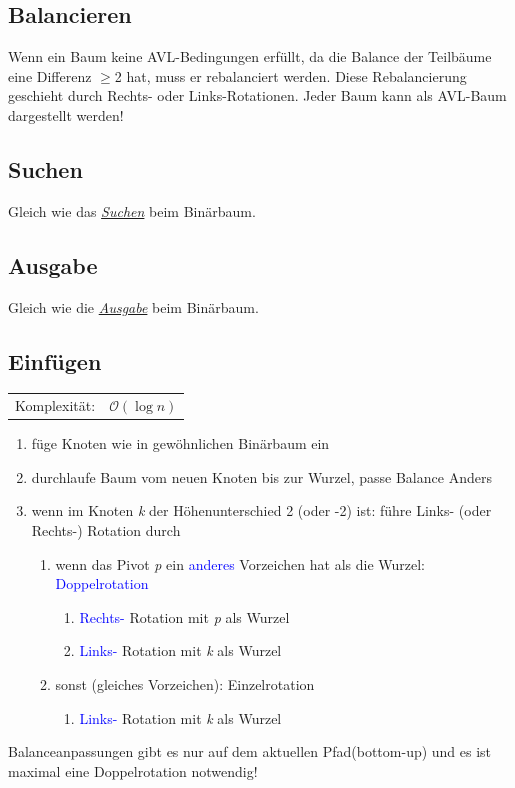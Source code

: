 \documentclass[12pt,a4paper]{article}
\begin{document}
\subsection{Balancieren}
Wenn ein Baum keine AVL-Bedingungen erfüllt, da die Balance der Teilbäume eine Differenz $\geq $2 hat, muss er rebalanciert werden. Diese Rebalancierung geschieht durch Rechts- oder Links-Rotationen. Jeder Baum kann als AVL-Baum dargestellt werden!

\subsection{Suchen}
Gleich wie das \textit{\hyperref[sec:SuchenBinaer]{Suchen}} beim Binärbaum.

\subsection{Ausgabe}
Gleich wie die \textit{\hyperref[sec:AusgabeBinaer]{Ausgabe}} beim Binärbaum.

\subsection{Einfügen}
\begin{tabularx}{\textwidth}{l l}
	Komplexität: &$\mathcal{O}(\log n)$\\
\end{tabularx}
\begin{enumerate}
	\item füge Knoten wie in gewöhnlichen Binärbaum ein
	\item durchlaufe Baum vom neuen Knoten bis zur Wurzel, passe Balance Anders
	\item wenn im Knoten \textit{k} der Höhenunterschied 2 (oder -2) ist: führe Links- (oder Rechts-) Rotation durch
	\begin{enumerate}
		\item wenn das Pivot \textit{p} ein \textcolor{blue}{anderes} Vorzeichen hat als die Wurzel: \textcolor{blue}{Doppelrotation}
		\begin{enumerate}
			\item \textcolor{blue}{Rechts-} Rotation mit \textit{p} als Wurzel
			\item \textcolor{blue}{Links-} Rotation mit \textit{k} als Wurzel
		\end{enumerate}
		\item sonst (gleiches Vorzeichen): Einzelrotation
		\begin{enumerate}
			\item \textcolor{blue}{Links-} Rotation mit \textit{k} als Wurzel
		\end{enumerate}
	\end{enumerate}
\end{enumerate}
Balanceanpassungen gibt es nur auf dem aktuellen Pfad(bottom-up) und es ist maximal eine Doppelrotation notwendig!
\end{document}
